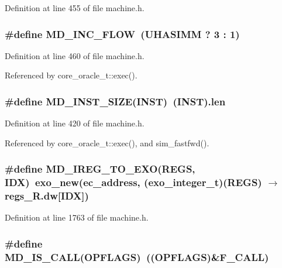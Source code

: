 Definition at line 455 of file machine.h.
\subsubsection[{MD\_\-INC\_\-FLOW}]{\setlength{\rightskip}{0pt plus 5cm}\#define MD\_\-INC\_\-FLOW~(UHASIMM ? 3 : 1)}\label{machine_8h_c2cab6744a434647b35f28d966f98d73}




Definition at line 460 of file machine.h.

Referenced by core\_\-oracle\_\-t::exec().
\subsubsection[{MD\_\-INST\_\-SIZE}]{\setlength{\rightskip}{0pt plus 5cm}\#define MD\_\-INST\_\-SIZE(INST)~(INST).len}\label{machine_8h_14c2828e3f3d84cfb676273b5dfc5bf8}




Definition at line 420 of file machine.h.

Referenced by core\_\-oracle\_\-t::exec(), and sim\_\-fastfwd().
\subsubsection[{MD\_\-IREG\_\-TO\_\-EXO}]{\setlength{\rightskip}{0pt plus 5cm}\#define MD\_\-IREG\_\-TO\_\-EXO(REGS, \/  IDX)~exo\_\-new(ec\_\-address, ({\bf exo\_\-integer\_\-t})(REGS) $\rightarrow$ regs\_\-R.dw[IDX])}\label{machine_8h_7e8e72605ceeeff6cc74197fe3a1aee3}




Definition at line 1763 of file machine.h.
\subsubsection[{MD\_\-IS\_\-CALL}]{\setlength{\rightskip}{0pt plus 5cm}\#define MD\_\-IS\_\-CALL(OPFLAGS)~((OPFLAGS)\&F\_\-CALL)}\label{machine_8h_bf65ee55212eb809f05a065fabe7a2a9}




